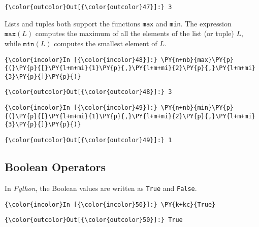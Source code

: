 \begin{Verbatim}[commandchars=\\\{\}]
{\color{outcolor}Out[{\color{outcolor}47}]:} 3
\end{Verbatim}
            
Lists and tuples both support the functions \texttt{max} and \texttt{min}. The expression
\(\texttt{max}(L)\) computes the maximum of all the elements of the list
(or tuple) \(L\), while \(\texttt{min}(L)\) computes the smallest
element of \(L\).

\begin{Verbatim}[commandchars=\\\{\}]
{\color{incolor}In [{\color{incolor}48}]:} \PY{n+nb}{max}\PY{p}{(}\PY{p}{[}\PY{l+m+mi}{1}\PY{p}{,}\PY{l+m+mi}{2}\PY{p}{,}\PY{l+m+mi}{3}\PY{p}{]}\PY{p}{)}
\end{Verbatim}


\begin{Verbatim}[commandchars=\\\{\}]
{\color{outcolor}Out[{\color{outcolor}48}]:} 3
\end{Verbatim}
            
\begin{Verbatim}[commandchars=\\\{\}]
{\color{incolor}In [{\color{incolor}49}]:} \PY{n+nb}{min}\PY{p}{(}\PY{p}{[}\PY{l+m+mi}{1}\PY{p}{,}\PY{l+m+mi}{2}\PY{p}{,}\PY{l+m+mi}{3}\PY{p}{]}\PY{p}{)}
\end{Verbatim}


\begin{Verbatim}[commandchars=\\\{\}]
{\color{outcolor}Out[{\color{outcolor}49}]:} 1
\end{Verbatim}
            
\subsection{Boolean Operators}\label{boolean-operators}

In \textsl{Python}, the Boolean values are written as \texttt{True} and \texttt{False}.

\begin{Verbatim}[commandchars=\\\{\}]
{\color{incolor}In [{\color{incolor}50}]:} \PY{k+kc}{True}
\end{Verbatim}

\begin{Verbatim}[commandchars=\\\{\}]
{\color{outcolor}Out[{\color{outcolor}50}]:} True
\end{Verbatim}
            
